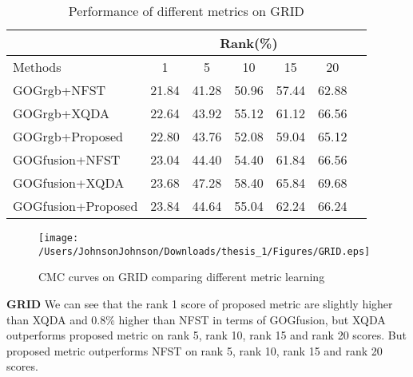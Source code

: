 \begin{table}[H]
\caption{Performance of different metrics on GRID}
\centering
\begin{tabular}{|l|c|c|c|c|c|c|}
\hline
& \multicolumn{5}{|c|}{Rank(\%)} \\
\hline
Methods& 1 & 5 &10& 15&20\\
\hline
GOGrgb+NFST& 21.84&41.28 &50.96& 57.44&62.88 \\ 
\hline
GOGrgb+XQDA& 22.64&43.92 &55.12 &61.12&66.56\\ 
\hline
GOGrgb+Proposed&22.80&43.76&52.08&59.04&65.12\\  %
\hline
GOGfusion+NFST& 23.04&44.40 &54.40 &61.84&66.56\\ 
\hline
GOGfusion+XQDA& 23.68&47.28 &58.40 &65.84&69.68 \\ 
\hline
GOGfusion+Proposed&23.84&44.64&55.04&62.24&66.24\\ %

\hline

\end{tabular}
\end{table}

\begin{figure}[H]
\begin{raggedleft}
\texttt{[image: /Users/JohnsonJohnson/Downloads/thesis\_1/Figures/GRID.eps]}
\vspace{-3em}
\caption{CMC curves on GRID comparing different metric learning}
\end{raggedleft}
\end{figure}

\textbf{GRID} We can see that the rank 1 score of proposed metric are slightly higher than XQDA and 0.8\% higher than NFST in terms of GOGfusion, but XQDA outperforms proposed metric on rank 5, rank 10, rank 15 and rank 20 scores. But proposed metric outperforms NFST on rank 5, rank 10, rank 15 and rank 20 scores.

